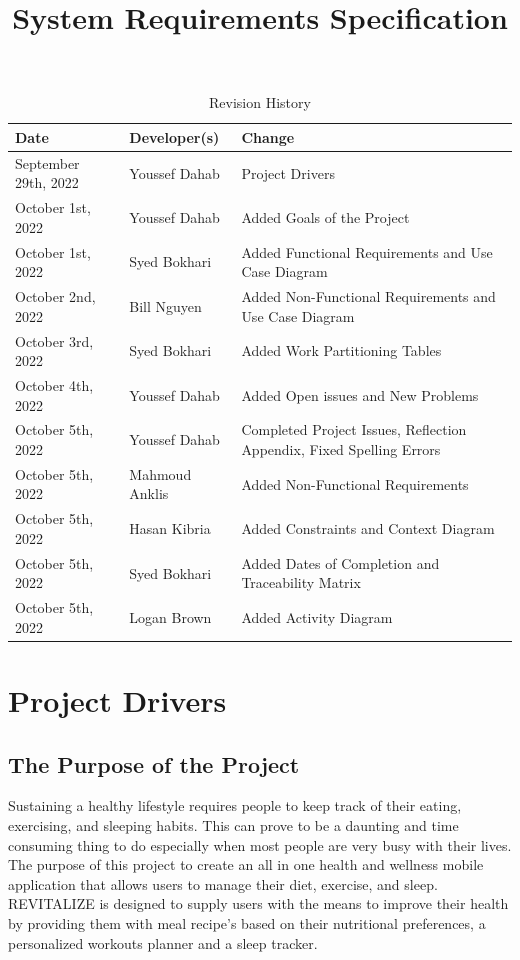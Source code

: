 \documentclass[12pt,letterpaper]{article}
\title{System Requirements Specification\\\progname}
\author{\authname}
\date{}
\begin{document}
\maketitle

\begin{table}[hp]
\caption{Revision History} \label{TblRevisionHistory}
\begin{tabularx}{\textwidth}{llX}
	\toprule
	\textbf{Date} & \textbf{Developer(s)} & \textbf{Change}\\
	\midrule
	September 29th, 2022 & Youssef Dahab & Project Drivers \\
	October 1st, 2022 & Youssef Dahab & Added Goals of the Project \\
	October 1st, 2022 & Syed Bokhari & Added Functional Requirements and Use Case Diagram \\
	October 2nd, 2022 & Bill Nguyen & Added Non-Functional Requirements and Use Case Diagram \\
	October 3rd, 2022 & Syed Bokhari & Added Work Partitioning Tables \\
	October 4th, 2022 & Youssef Dahab & Added Open issues and New Problems \\
	October 5th, 2022 & Youssef Dahab & Completed Project Issues, Reflection Appendix, Fixed Spelling Errors\\
	October 5th, 2022 & Mahmoud Anklis & Added Non-Functional Requirements\\
	October 5th, 2022 & Hasan Kibria & Added Constraints and Context Diagram \\
	October 5th, 2022 & Syed Bokhari & Added Dates of Completion and Traceability Matrix \\
	October 5th, 2022 & Logan Brown & Added Activity Diagram\\
	\bottomrule
\end{tabularx}
\end{table}

\newpage
\tableofcontents
\newpage

\section{Project Drivers}

\subsection{The Purpose of the Project}
Sustaining a healthy lifestyle requires people to keep track of their eating, exercising, and sleeping habits. This can prove to be a daunting and time consuming thing to do especially when most people are very busy with their lives. The purpose of this project to create an all in one health and wellness mobile application that allows users to manage their diet, exercise, and sleep. REVITALIZE is designed to supply users with the means to improve their health by providing them with meal recipe's based on their nutritional preferences, a personalized workouts planner and a sleep tracker. 
\end{document}
